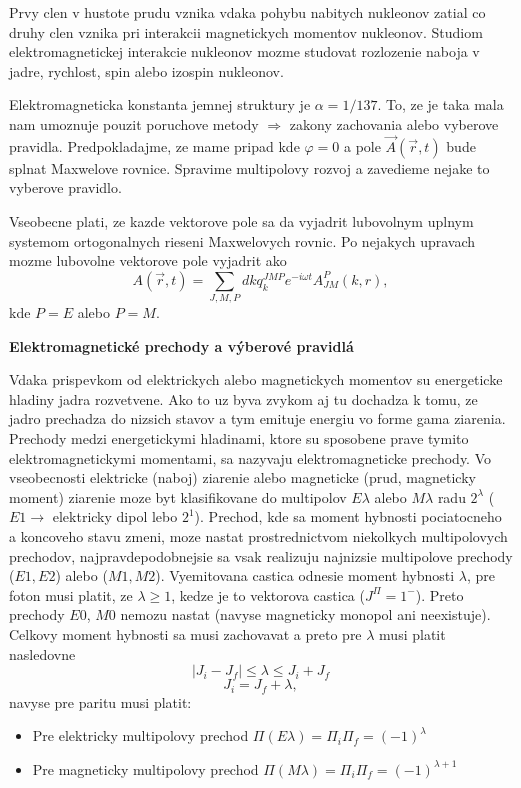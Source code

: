 \documentclass[../../main.tex]{subfiles}
\begin{document}
\par
Prvy clen v hustote prudu vznika vdaka pohybu nabitych nukleonov zatial co druhy clen vznika pri interakcii magnetickych momentov nukleonov. Studiom elektromagnetickej interakcie nukleonov mozme studovat rozlozenie naboja v jadre, rychlost, spin alebo izospin nukleonov.\par
Elektromagneticka konstanta jemnej struktury je $\alpha=1/137$. To, ze je taka mala nam umoznuje pouzit poruchove metody $\Rightarrow$ zakony zachovania alebo vyberove pravidla. Predpokladajme, ze mame pripad kde $\varphi=0$ a pole $\vec{A}(\vec{r},t)$ bude splnat Maxwelove rovnice. Spravime multipolovy rozvoj a zavedieme nejake to vyberove pravidlo.\par
Vseobecne plati, ze kazde vektorove pole sa da vyjadrit lubovolnym uplnym systemom ortogonalnych rieseni Maxwelovych rovnic. Po nejakych upravach mozme lubovolne vektorove pole vyjadrit ako 
\begin{equation}
A(\vec{r},t) = \sum_{J,M,P}dkq_k^{JMP}e^{-i\omega t}A_{JM}^P(k,r), 
\end{equation}
kde $P=E$ alebo $P=M$.\par
\textbf{Elektromagnetické prechody a výberové pravidlá}\par
Vdaka prispevkom od elektrickych alebo magnetickych momentov su energeticke hladiny jadra rozvetvene. Ako to uz byva zvykom aj tu dochadza k tomu, ze jadro prechadza do nizsich stavov a tym emituje energiu vo forme gama ziarenia. Prechody medzi energetickymi hladinami, ktore su sposobene prave tymito elektromagnetickymi momentami, sa nazyvaju elektromagneticke prechody. Vo vseobecnosti elektricke (naboj)
ziarenie alebo magneticke (prud, magneticky moment) ziarenie moze byt klasifikovane do multipolov $E\lambda$ alebo $M\lambda$ radu $2^{\lambda}$ ($E1\rightarrow$ elektricky dipol lebo $2^1$). Prechod, kde sa moment hybnosti pociatocneho a koncoveho stavu zmeni, moze nastat prostrednictvom niekolkych multipolovych prechodov, najpravdepodobnejsie sa vsak realizuju najnizsie multipolove prechody ($E1,E2$) alebo ($M1,M2$). Vyemitovana castica odnesie moment hybnosti $\lambda$, pre foton musi platit, ze $\lambda\geq1$, kedze je to vektorova castica ($J^{\Pi}=1^{-}$). Preto prechody $E0$, $M0$ nemozu nastat (navyse magneticky monopol ani neexistuje). Celkovy moment hybnosti sa musi zachovavat a preto pre $\lambda$ musi platit nasledovne
$$ \lvert J_i-J_f \rvert \leq \lambda \leq J_i+J_f $$
$$ J_i=J_f+\lambda,$$
navyse pre paritu musi platit:
\begin{itemize}
	\item Pre elektricky multipolovy prechod $\Pi(E\lambda)=\Pi_i\Pi_f=(-1)^{\lambda}$
	\item Pre magneticky multipolovy prechod $\Pi(M\lambda)=\Pi_i\Pi_f=(-1)^{\lambda+1}$
\end{itemize}
\end{document}
